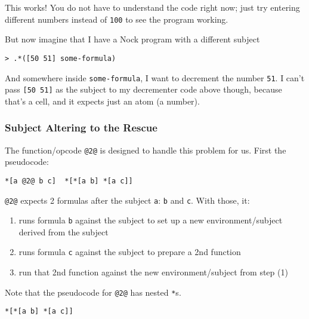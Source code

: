 \documentclass[twoside]{article}
\begin{document}
\noindent
This works! You do not have to understand the code right now; just try entering different numbers instead of \lstinline[style=inlinecode]{100} to see the program working.

But now imagine that I have a Nock program with a different subject

\begin{lstlisting}[style=listingblock]
> .*([50 51] some-formula)
\end{lstlisting}

And somewhere inside \lstinline[style=inlinecode]{some-formula}, I want to decrement the number \lstinline[style=inlinecode]{51}. I can't pass \lstinline[style=inlinecode]{[50 51]} as the subject to my decrementer code above though, because that's a cell, and it expects just an atom (a number).

\subsubsection{Subject Altering to the Rescue}

The function/opcode \lstinline[style=inlinecode]{@2@} is designed to handle this problem for us. First the pseudocode:

\begin{lstlisting}[style=listingcode]
*[a @2@ b c]  *[*[a b] *[a c]]
\end{lstlisting}

\lstinline[style=inlinecode]{@2@} expects 2 formulas after the subject \lstinline[style=inlinecode]{a}: \lstinline[style=inlinecode]{b} and \lstinline[style=inlinecode]{c}. With those, it:

\begin{enumerate}
  \item  runs formula \lstinline[style=inlinecode]{b} against the subject to set up a new environment/subject derived from the subject
  \item  runs formula \lstinline[style=inlinecode]{c} against the subject to prepare a 2nd function
  \item  run that 2nd function against the new environment/subject from step (1)
\end{enumerate}

Note that the pseudocode for \lstinline[style=inlinecode]{@2@} has nested \lstinline[style=inlinecode]{*}s.

\begin{lstlisting}[style=listingblock]
*[*[a b] *[a c]]
\end{lstlisting}
\end{document}
